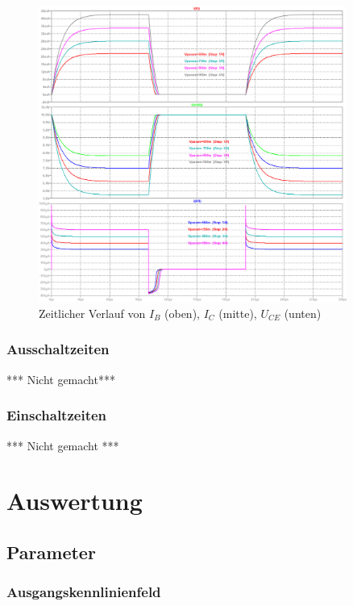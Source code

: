\documentclass[
	a4paper, %
	12pt, %
]{CSUniSchoolLabReport}
\begin{document}
\begin{figure}[H]
	\centering
	\includegraphics[width=0.9\textwidth]{Figures/LTSpiceTime300u.png}
	\caption{Zeitlicher Verlauf von $I_B$ (oben), $I_C$ (mitte), $U_{CE}$ (unten)}
	\label{fig:300uVerlauf3}
\end{figure}


\subsubsection{Ausschaltzeiten}
*** Nicht gemacht***


\subsubsection{Einschaltzeiten}
*** Nicht gemacht ***
\section{Auswertung}
\subsection{Parameter}
\subsubsection{Ausgangskennlinienfeld}
\end{document}
